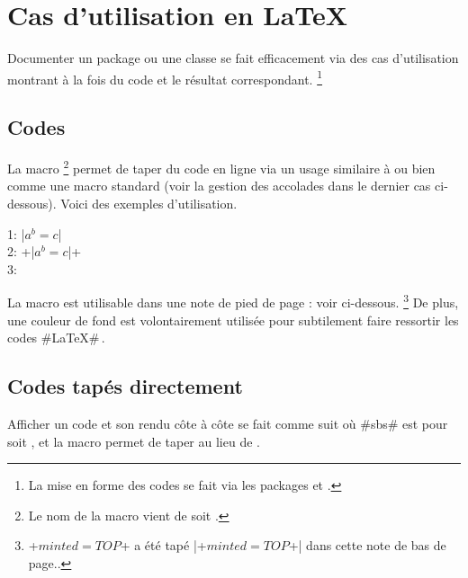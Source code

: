 \documentclass{tutodoc}
\begin{document}
\section{Cas d'utilisation en \LaTeX}
\label{tutodoc-listing-latex}

Documenter un package ou une classe se fait efficacement via des cas d'utilisation montrant à la fois du code et le résultat correspondant.%
\footnote{
    La mise en forme des codes se fait via les packages  et  .
}



\subsection{Codes }
\label{tutodoc-listing-latex-inline}

La macro 
\footnote{
    Le nom de la macro  vient de  soit .
}
permet de taper du code en ligne via un usage similaire à  ou bien comme une macro standard (voir la gestion des accolades dans le dernier cas ci-dessous).
Voici des exemples d'utilisation.


\begin{tdoclatex}
    1: \tdoclatexin|$a^b = c$|               \\
    2: \tdoclatexin+\tdoclatexin|$a^b = c$|+ \\
    3: 
\end{tdoclatex}


\begin{tdocnote}
    La macro  est utilisable dans une note de pied de page : voir ci-dessous.
    \footnote{
        \tdoclatexin+$minted = TOP$+ a été tapé \tdoclatexin|\tdoclatexin+$minted = TOP$+| dans cette note de bas de page..
    }
    De plus, une couleur de fond est volontairement utilisée pour subtilement faire ressortir les codes \tdoclatexin#\LaTeX#\,.
\end{tdocnote}



\subsection{Codes tapés directement}

\begin{tdocexa}
    Afficher un code et son rendu côte à côte se fait comme suit où \tdoclatexin#sbs# est pour  soit , et la macro  permet de taper  au lieu de .

\end{tdocexa}
\end{document}

